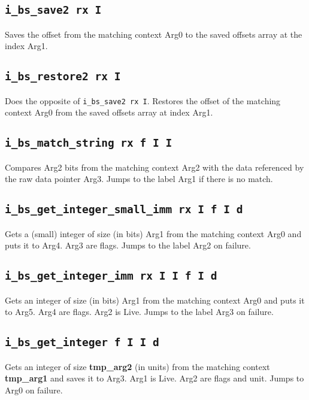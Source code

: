 \documentclass{article}
\newcommand{\tmpa}{\textbf{tmp\_arg1}}
\newcommand{\tmpb}{\textbf{tmp\_arg2}}
\newcommand{\iop}[1]{\texttt{#1}}
\begin{document}
\subsection*{\iop{i\_bs\_save2 rx I}}

Saves the offset from the matching context Arg0 to the saved offsets array at
the index Arg1.

\subsection*{\iop{i\_bs\_restore2 rx I}}

Does the opposite of \iop{i\_bs\_save2 rx I}. Restores the offset of the
matching context Arg0 from the saved offsets array at index Arg1.

\subsection*{\iop{i\_bs\_match\_string rx f I I}}

Compares Arg2 bits from the matching context Arg2 with the data referenced by
the raw data pointer Arg3. Jumps to the label Arg1 if there is no match.

\subsection*{\iop{i\_bs\_get\_integer\_small\_imm rx I f I d}}

Gets a (small) integer of size (in bits) Arg1 from the matching context Arg0 and
puts it to Arg4. Arg3 are flags. Jumps to the label Arg2 on failure.

\subsection*{\iop{i\_bs\_get\_integer\_imm rx I I f I d}}

Gets an integer of size (in bits) Arg1 from the matching context Arg0 and puts
it to Arg5. Arg4 are flags. Arg2 is Live. Jumps to the label Arg3 on failure.

\subsection*{\iop{i\_bs\_get\_integer f I I d}}

Gets an integer of size \tmpb{} (in units) from the matching context \tmpa{} and
saves it to Arg3. Arg1 is Live.  Arg2 are flags and unit. Jumps to Arg0 on
failure.
\end{document}
